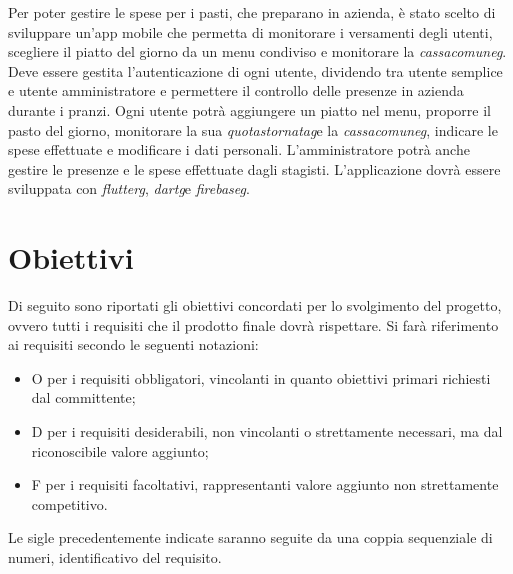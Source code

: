 Per poter gestire le spese per i pasti, che preparano in azienda, è stato scelto di sviluppare un'app mobile che permetta di monitorare i versamenti degli utenti, scegliere il piatto del giorno da un menu condiviso e monitorare la \emph{\gls{cassacomuneg}}\glsfirstoccur.\newline
Deve essere gestita l'autenticazione di ogni utente, dividendo tra utente semplice e utente amministratore e permettere il controllo delle presenze in azienda durante i pranzi. \newline
Ogni utente potrà aggiungere un piatto nel menu, proporre il pasto del giorno, monitorare la sua \emph{\gls{quotastornatag}}\glsfirstoccur\space e la \emph{\gls{cassacomuneg}}, indicare le spese effettuate e modificare i dati personali. \newline
L'amministratore potrà anche gestire le presenze e le spese effettuate dagli stagisti.
L'applicazione dovrà essere sviluppata con \emph{\gls{flutterg}}\glsfirstoccur, \emph{\gls{dartg}}\glsfirstoccur\space  e \emph{\gls{firebaseg}}\glsfirstoccur.

\section{Obiettivi}
\label{sec:obbiettivi}

Di seguito sono riportati gli obiettivi concordati per lo svolgimento del progetto, ovvero tutti i requisiti che il prodotto finale dovrà rispettare.\newline
Si farà riferimento ai requisiti secondo le seguenti notazioni:
\begin{itemize}
    \item O per i requisiti obbligatori, vincolanti in quanto obiettivi primari richiesti dal committente;
    \item D per i requisiti desiderabili, non vincolanti o strettamente necessari, ma dal riconoscibile valore aggiunto;
    \item F per i requisiti facoltativi, rappresentanti valore aggiunto non strettamente competitivo.
\end{itemize}
Le sigle precedentemente indicate saranno seguite da una coppia sequenziale di numeri, identificativo del requisito.\newline


